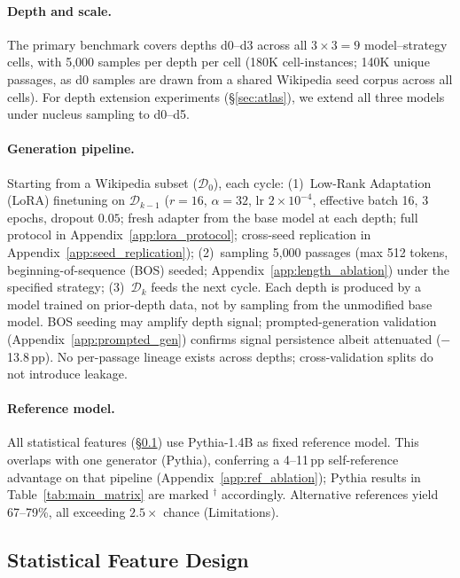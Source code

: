 \paragraph{Depth and scale.}
The primary benchmark covers depths d0--d3 across all $3 \times 3 = 9$ model--strategy cells, with 5{,}000 samples per depth per cell (180K cell-instances; 140K unique passages, as d0 samples are drawn from a shared Wikipedia seed corpus across all cells).
For depth extension experiments (\S\ref{sec:atlas}), we extend all three models under nucleus sampling to d0--d5.

\paragraph{Generation pipeline.}
Starting from a Wikipedia subset ($\mathcal{D}_0$), each cycle: (1)~Low-Rank Adaptation (LoRA) finetuning \cite{hu2022lora} on $\mathcal{D}_{k-1}$ ($r{=}16$, $\alpha{=}32$, lr $2{\times}10^{-4}$, effective batch 16, 3 epochs, dropout $0.05$; fresh adapter from the base model at each depth; full protocol in Appendix~\ref{app:lora_protocol}; cross-seed replication in Appendix~\ref{app:seed_replication}); (2)~sampling 5{,}000 passages (max 512 tokens, beginning-of-sequence (BOS) seeded; Appendix~\ref{app:length_ablation}) under the specified strategy; (3)~$\mathcal{D}_k$ feeds the next cycle.
Each depth is produced by a model trained on prior-depth data, not by sampling from the unmodified base model.
BOS seeding may amplify depth signal; prompted-generation validation (Appendix~\ref{app:prompted_gen}) confirms signal persistence albeit attenuated ($-$13.8\,pp).
No per-passage lineage exists across depths; cross-validation splits do not introduce leakage.

\paragraph{Reference model.}
All statistical features (\S\ref{sec:method:features}) use Pythia-1.4B as fixed reference model.
This overlaps with one generator (Pythia), conferring a 4--11\,pp self-reference advantage on that pipeline (Appendix~\ref{app:ref_ablation}); Pythia results in Table~\ref{tab:main_matrix} are marked $^\dagger$ accordingly.
Alternative references yield 67--79\%, all exceeding $2.5{\times}$ chance (Limitations).

\subsection{Statistical Feature Design}
\label{sec:method:features}

